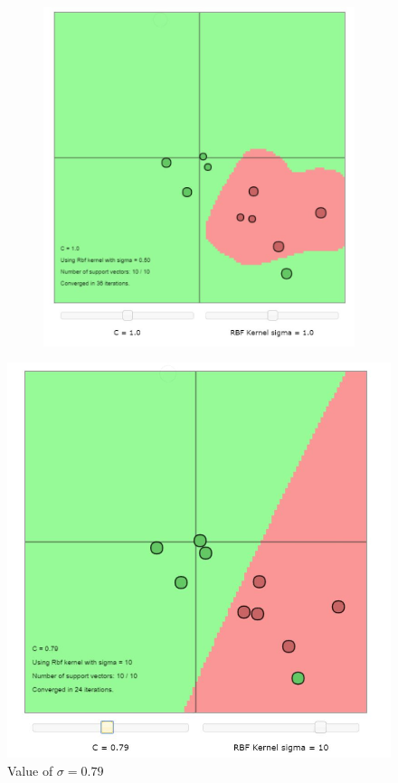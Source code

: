 \documentclass[11pt,oneside,a4paper]{article}
\begin{document}
\begin{figure}[h!]
\begin{subfigure}[b]{.5\textwidth}
 	\end{subfigure}%
 	\begin{subfigure}{.5\textwidth}
 		\vspace{-185pt}
 		\centering
 		\includegraphics[width=0.9\linewidth]{../Figures/Default_RBF}
 	\end{subfigure}
 \end{figure}
\begin{figure}
	\centering
 		\includegraphics[scale=0.5]{../Figures/RBF_sigma_10_C_079}
 		\caption{Value of $\sigma = 0.79$}
\end{figure}%
\end{document}
